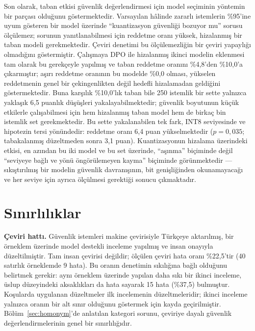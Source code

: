 \documentclass[conference]{IEEEtran}
\begin{document}
Son olarak, taban etkisi güvenlik değerlendirmesi için model seçiminin
yöntemin bir parçası olduğunu göstermektedir. Varsayılan hâlinde zararlı
istemlerin \%95'ine uyum gösteren bir model üzerinde ``kuantizasyon güvenliği
bozuyor mu'' sorusu ölçülemez; sorunun yanıtlanabilmesi için reddetme oranı
yüksek, hizalanmış bir taban modeli gerekmektedir. Çeviri denetimi bu
ölçülemezliğin bir çeviri yapaylığı olmadığını göstermiştir. Çalışmaya DPO ile
hizalanmış ikinci modelin eklenmesi tam olarak bu gerekçeyle yapılmış ve taban
reddetme oranını \%4,8'den \%10,0'a çıkarmıştır; aşırı reddetme oranının bu
modelde \%0,0 olması, yükselen reddetmenin genel bir çekingenlikten değil
hedefli hizalamadan geldiğini göstermektedir. Buna karşılık \%10,0'lık taban
bile 250 istemlik bir sette yalnızca yaklaşık 6,5 puanlık düşüşleri
yakalayabilmektedir; güvenlik boyutunun küçük etkilerle çalışabilmesi için
hem hizalanmış taban model hem de birkaç bin istemlik set gerekmektedir.
Bu sette yakalanabilen tek fark, INT8 seviyesinde ve hipotezin tersi
yönündedir: reddetme oranı 6,4 puan yükselmektedir ($p=0{,}035$; tabakalanmış
düzeltmeden sonra 3,1 puan). Kuantizasyonun hizalama üzerindeki etkisi, en
azından bu iki model ve bu set üzerinde, ``aşınma'' biçiminde değil
``seviyeye bağlı ve yönü öngörülemeyen kayma'' biçiminde görünmektedir ---
sıkıştırılmış bir modelin güvenlik davranışının, bit genişliğinden
okunamayacağı ve her seviye için ayrıca ölçülmesi gerektiği sonucu
çıkmaktadır.

\section{Sınırlılıklar}
\label{sec:sinirliliklar}

\textbf{Çeviri hattı.} Güvenlik istemleri makine çevirisiyle Türkçeye
aktarılmış, bir örneklem üzerinde model destekli inceleme yapılmış ve insan
onayıyla düzeltilmiştir. Tam insan çevirisi değildir; ölçülen çeviri hata oranı
\%22{,}5'tir (40 satırlık örneklemde 9 hata). Bu oranın denetimin sıkılığına
bağlı olduğunu belirtmek gerekir: aynı örneklem üzerinde yapılan daha sıkı bir
ikinci inceleme, üslup düzeyindeki aksaklıkları da hata sayarak 15 hata
(\%37{,}5) bulmuştur. Koşularda uygulanan düzeltmeler ilk incelemenin
düzeltmeleridir; ikinci inceleme yalnızca oranın bir alt sınır olduğunu
göstermek için kayda geçirilmiştir. Bölüm~\ref{sec:homonym}'de anlatılan kategori sorunu, çeviriye
dayalı güvenlik değerlendirmelerinin genel bir sınırlılığıdır.
\end{document}

